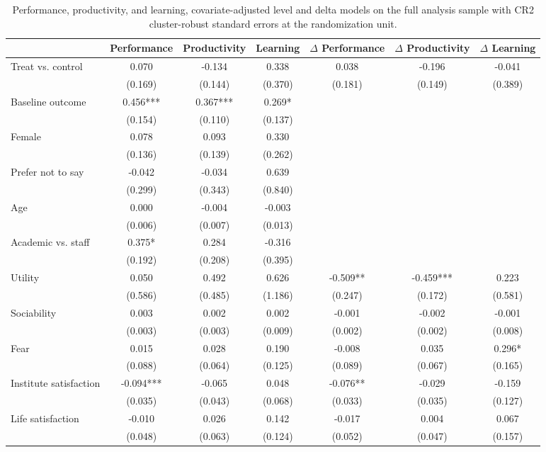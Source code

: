 \begin{table}
\centering
\caption{Performance, productivity, and learning, covariate-adjusted level and delta models on the full analysis sample with CR2 cluster-robust standard errors at the randomization unit.\label{tab:lm-performance-cov-effective}}
\centering
\begin{tabular}[t]{lcccccc}
\toprule
  & Performance & Productivity & Learning & $\Delta$ Performance & $\Delta$ Productivity & $\Delta$ Learning\\
\midrule
Treat vs. control & 0.070 & -0.134 & 0.338 & 0.038 & -0.196 & -0.041\\
 & (0.169) & (0.144) & (0.370) & (0.181) & (0.149) & (0.389)\\
Baseline outcome & 0.456*** & 0.367*** & 0.269* &  &  & \\
 & (0.154) & (0.110) & (0.137) &  &  & \\
Female & 0.078 & 0.093 & 0.330 &  &  & \\
 & (0.136) & (0.139) & (0.262) &  &  & \\
Prefer not to say & -0.042 & -0.034 & 0.639 &  &  & \\
 & (0.299) & (0.343) & (0.840) &  &  & \\
Age & 0.000 & -0.004 & -0.003 &  &  & \\
 & (0.006) & (0.007) & (0.013) &  &  & \\
Academic vs. staff & 0.375* & 0.284 & -0.316 &  &  & \\
 & (0.192) & (0.208) & (0.395) &  &  & \\
Utility & 0.050 & 0.492 & 0.626 & -0.509** & -0.459*** & 0.223\\
 & (0.586) & (0.485) & (1.186) & (0.247) & (0.172) & (0.581)\\
Sociability & 0.003 & 0.002 & 0.002 & -0.001 & -0.002 & -0.001\\
 & (0.003) & (0.003) & (0.009) & (0.002) & (0.002) & (0.008)\\
Fear & 0.015 & 0.028 & 0.190 & -0.008 & 0.035 & 0.296*\\
 & (0.088) & (0.064) & (0.125) & (0.089) & (0.067) & (0.165)\\
Institute satisfaction & -0.094*** & -0.065 & 0.048 & -0.076** & -0.029 & -0.159\\
 & (0.035) & (0.043) & (0.068) & (0.033) & (0.035) & (0.127)\\
Life satisfaction & -0.010 & 0.026 & 0.142 & -0.017 & 0.004 & 0.067\\
 & (0.048) & (0.063) & (0.124) & (0.052) & (0.047) & (0.157)\\

\end{tabular}
\end{table}
